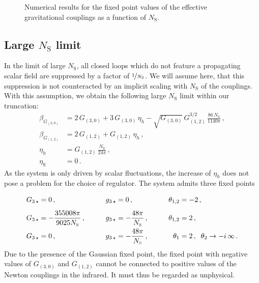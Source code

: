 \documentclass[11pt]{book}
\newcommand\etaS{ \eta_{\scriptscriptstyle{\mathrm{S}}} }
\newcommand\NS{ N_{\scriptscriptstyle{\mathrm{S}}} }
\numberwithin{equation}{chapter}
\begin{document}
\begin{figure}[t]
  \begin{center}
    
  \end{center}
  \caption{
    Numerical results for the fixed point values
    of the effective gravitational couplings
    as a function of $\NS$.
  }
  \label{fig:effectiveG}
\end{figure}


\subsection{Large $\NS$ limit}

In the limit of large $\NS$, all closed loops which do not feature a
propagating scalar field are suppressed by a factor of $\nicefrac{1}{\NS}$.
We will assume here, that this suppression is not counteracted by an implicit scaling
with $\NS$ of the couplings.
With this assumption, we obtain the following large $\NS$ limit within our truncation:
\begin{align}
  \beta_{G_{(3,0)}}
  &= 2 \, G_{(3,0)} + 3 \, G_{(3,0)} \, \eta_h
  - \sqrt{G_{(3,0)}} \, G_{(1,2)}^{3/2} \, \frac{86 \, \NS}{1140 \pi} \,, \\[3pt]
  \beta_{G_{(1,2)}} &= 2 \, G_{(1,2)} + G_{(1,2)} \, \eta_h \,, \\[3pt]
  \eta_h &= G_{(1,2)} \, \frac{\NS}{24 \pi} \,, \\[3pt]
  \etaS &= 0 \,.
\end{align}
As the system is only driven by scalar fluctuations, the increase of
$\eta_h$ does not pose a problem for the choice of regulator.
The system admits three fixed points
\begin{alignat}{5}
  \vphantom{ \frac{48 \pi}{\NS} }
  G_{3\, \star}  &= 0 \,,                                  & g_{3\, \star}  &= 0 \,,                         & \theta_{1,2}   &=-2 \,, \\
  G_{3\, \star}  &=-\frac{355008 \pi}{9025 \NS} \,, \qquad & g_{3\, \star}  &=-\frac{48 \pi}{\NS} \,, \qquad & \theta_{1,2}   &= 2 \,, \\
  G_{3\, \star}  &= 0 \,,                                  & g_{3\, \star}  &=-\frac{48 \pi}{\NS} \,,        & \theta_1       &= 2 \,, \;\; \theta_2 \rightarrow - i \, \infty \,.
\end{alignat}
Due to the presence of the Gaussian fixed point, the fixed point with
negative values of  $G_{(3,0)}$ and $G_{(1,2)}$ cannot be connected
to positive values of the Newton couplings in the infrared. It must thus
be regarded as unphysical.
\end{document}
